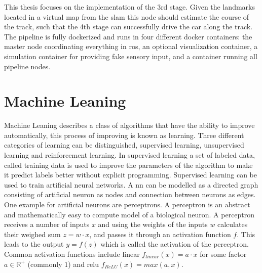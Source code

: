 This thesis focuses on the implementation of the 3rd stage. Given the landmarks located in a virtual map from the \ac{slam} this node should estimate the course of the track, such that the 4th stage can successfully drive the car along the track.
The pipeline is fully dockerized and runs in four different docker containers: the master node coordinating everything in \ac{ros}, an optional visualization container, a simulation container for providing fake sensory input, and a container running all pipeline nodes.

\section{Machine Leaning}
Machine Leaning describes a class of algorithms that have the ability to improve automatically, this process of improving is known as learning. Three different categories of learning can be distinguished, supervised learning, unsupervised learning and reinforcement learning. In supervised learning a set of labeled data, called training data is used to improve the parameters of the algorithm to make it predict labels better without explicit programming. Supervised learning can be used to train artificial neural networks. A \ac{nn} can be modelled as a directed graph consisting of artificial neuron as nodes and connection between neurons as edges. One example for artificial neurons are perceptrons. A perceptron is an abstract and mathematically easy to compute model of a biological neuron. A perceptron receives a number of inputs $x$ and using the weights of the inputs $w$ calculates their weighed sum $z=w \cdot x$, and passes it through an activation function $f$. This leads to the output
$y=f(z)$ which is called the activation of the perceptron. Common activation functions include linear $f_{linear}(x)=a \cdot x$ for some factor $a \in \mathbb{R^+}$ (commonly $1$) and \ac{relu} $f_{ReLU}(x)=max(a,x)$.

